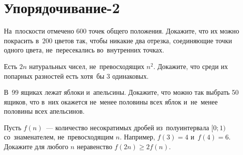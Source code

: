 
\section*{Упорядочивание-2}


\begin{problems}

\item
На~плоскости отмечено $600$ точек общего положения.
Докажите, что их можно покрасить в~$200$ цветов так, чтобы никакие два отрезка,
соединяющие точки одного цвета, не~пересекались во~внутренних точках.

\item
Есть $2 n$ натуральных чисел, не~превосходящих $n^2$.
Докажите, что среди их попарных разностей есть хотя~бы $3$ одинаковых.

\item
В~99 ящиках лежат яблоки и~апельсины.
Докажите, что можно так выбрать 50 ящиков, что в~них окажется не~менее половины
всех яблок и~не~менее половины всех апельсинов.

\item
Пусть $f(n)$~--- количество несократимых дробей из~полуинтервала $[0; 1)$
со~знаменателем, не~превосходящим $n$.
Например, $f(3) = 4$ и~$f(4) = 6$.
Докажите для любого $n$ неравенство $f(2 n) \geq 2 f(n)$.

\end{problems}

